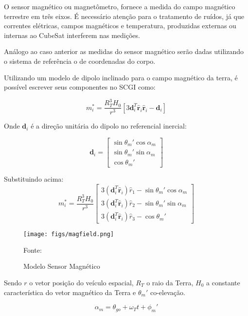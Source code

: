 O sensor magnético ou magnetômetro, fornece a medida do campo magnético terrestre em três eixos. É necessário atenção para o tratamento de ruídos, já que correntes elétricas, campos magnéticos e temperatura, produzidas externas ou internas ao CubeSat interferem nas medições.

Análogo ao caso anterior as medidas do sensor magnético serão dadas utilizando o sistema de referência o de coordenadas do corpo. 

Utilizando um modelo de dipolo inclinado para o campo magnético da terra, é possível escrever seus componentes no SCGI como:

\begin{equation}
m_i^* = \frac{R_T^3H_0}{r^3}\left [ 3\mathbf{d}_i^T\mathbf{\hat{r}}_i\mathbf{\hat{r}}_i-\mathbf{d}_i \right ]
\end{equation}

Onde $\mathbf{d}_i$ é a direção unitária do dipolo no referencial inercial:

\begin{equation}
\mathbf{d}_i=\begin{bmatrix} \sin\theta_m'\cos\alpha_m \\\sin\theta_m'\sin\alpha_m \\ \cos\theta_m'\end{bmatrix}
\end{equation}

Substituindo acima:
\begin{equation}
m_i^*=\frac{R_T^3H_0}{r^3}\begin{bmatrix} 3(\mathbf{d}_i^T\mathbf{\hat{r}}_i)\hat{r}_1 -\sin\theta_m'\cos\alpha_m \\ 3(\mathbf{d}_i^T\mathbf{\hat{r}}_i)\hat{r}_2-\sin\theta_m'\sin\alpha_m \\3(\mathbf{d}_i^T\mathbf{\hat{r}}_i)\hat{r}_3-\cos\theta_m'\end{bmatrix}
\end{equation}

\begin{figure}[htpb]
\centering
\texttt{[image: figs/magfield.png]}
\caption{Modelo Sensor Magnético}
{Fonte: \cite[p.~13]{mahdi2018attitude}}
\label{fig:4}
\end{figure}

Sendo $r$ o vetor posição do veículo espacial, $R_T$ o raio da Terra, $H_0$ a constante característica do vetor magnético da Terra e $\theta_m'$ co-elevação.

\begin{equation}
\alpha_m = \theta_{go}+\omega_Tt+\phi_m'
\end{equation}

